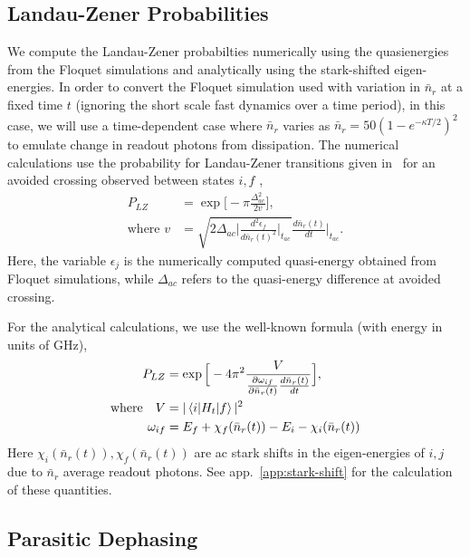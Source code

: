 \documentclass[prx,showpacs,notitlepage,twocolumn,superscriptaddress,nofootinbib,preprintnumbers,floatfix]{revtex4-2}
\begin{document}
\subsection{Landau-Zener Probabilities}\label{app:LZ}
We compute the Landau-Zener probabilties numerically using the quasienergies from the Floquet simulations and analytically using the stark-shifted eigen-energies. In order to convert the Floquet simulation used with variation in $\bar n_r$ at a fixed time $t$ (ignoring the short scale fast dynamics over a time period), in this case, we will use a time-dependent case where $\bar n_r$ varies as $\bar n_r=50(1-e^{-\kappa T/2})^2$ to emulate change in readout photons from dissipation. The numerical calculations use the probability for Landau-Zener transitions given in~\cite{ikeda2022floquet} for an avoided crossing observed between states $i,f$ ,
\begin{align}
    P_{LZ}&=\exp{\Big[-\pi \frac{\Delta_{ac}^2}{2v}\Big]},\\
    \text{where } v&=\sqrt{2\Delta_{ac}\Big|\frac{d^2\epsilon_f}{d\bar{n}_r(t)^2}\Big|_{t_{ac}}}\frac{d\bar{n}_r(t)}{dt}|_{t_{ac}}\Big.
\end{align}
Here, the variable $\epsilon_j$ is the numerically computed quasi-energy obtained from Floquet simulations, while $\Delta_{ac}$ refers to the quasi-energy difference at avoided crossing.

For the analytical calculations, we use the well-known formula (with energy in units of GHz), 
\begin{align}
    P_{LZ}&=\exp{\Big[-4\pi^2 \frac{V}{\frac{\partial\omega_{if}}{\partial\bar n_r(t)}\frac{d\bar n_r(t)}{dt}}\Big]},\\
    \text{where}\quad V&=|\braket{i|H_{t}|f}|^2\\
    \omega_{if}&=E_f+\chi_f(\bar n_r(t))-E_i-\chi_i(\bar n_r(t))
\end{align}
Here $\chi_i(\bar n_r(t)), \chi_f(\bar n_r(t))$ are ac stark shifts in the eigen-energies of $i,j$ due to $\bar n_r$ average readout photons. See app.~\ref{app:stark-shift} for the calculation of these quantities.
\subsection{Parasitic Dephasing}\label{app:dephasing}
\end{document}
